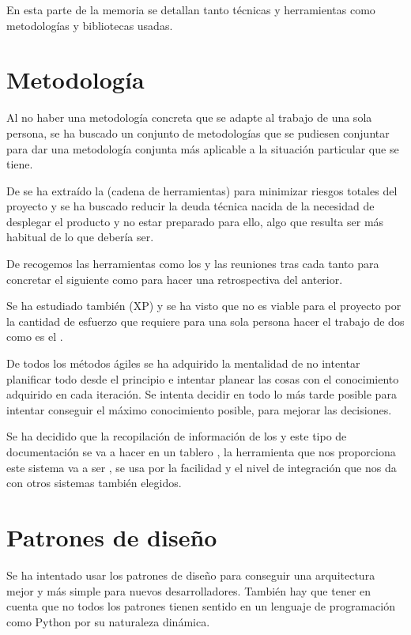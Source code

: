 
En esta parte de la memoria se detallan tanto técnicas y herramientas como metodologías y bibliotecas usadas.


\section{Metodología}

Al no haber una metodología concreta que se adapte al trabajo de una sola persona, se ha buscado un conjunto de metodologías que se pudiesen conjuntar para dar una metodología conjunta más aplicable a la situación particular que se tiene. 

De  se ha extraído la  (cadena de herramientas) para minimizar riesgos totales del proyecto y se ha buscado reducir la deuda técnica nacida de la necesidad de desplegar el producto y no estar preparado para ello, algo que resulta ser más habitual de lo que debería ser.

De  recogemos las herramientas como los  y las reuniones tras cada  tanto para concretar el siguiente  como para hacer una retrospectiva del anterior. 

Se ha estudiado también  (XP) y se ha visto que no es viable para el proyecto por la cantidad de esfuerzo que requiere para una sola persona hacer el trabajo de dos como es el . 

De todos los métodos ágiles se ha adquirido la mentalidad de no intentar planificar todo desde el principio e intentar planear las cosas con el conocimiento adquirido en cada iteración. Se intenta decidir en todo lo más tarde posible para intentar conseguir el máximo conocimiento posible, para mejorar las decisiones.

Se ha decidido que la recopilación de información de los  y este tipo de documentación se va a hacer en un tablero , la herramienta que nos proporciona este  sistema va a ser , se usa por la facilidad y el nivel de integración que nos da con otros sistemas también elegidos.


\section{Patrones de diseño}

Se ha intentado usar los patrones de diseño para conseguir una arquitectura mejor y más simple para nuevos desarrolladores. También hay que tener en cuenta que no todos los patrones tienen sentido en un lenguaje de programación como Python por su naturaleza dinámica.

